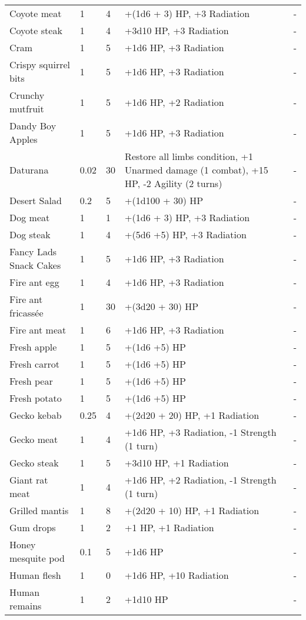 \documentclass{report}
\begin{document}
\begin{table}[H]
\begin{table}[H]
\begin{table}[H]
\begin{table}[H]
\begin{table}[H]
\begin{table}[H]
\begin{table}[H]
\begin{table}[H]
\begin{table}[H]
\begin{table}[H]
\begin{table}[H]
\begin{table}[H]
\begin{table}[H]
\begin{table}[H]
\begin{table}[H]
\begin{tabular}{p{30mm}p{30mm}p{30mm}p{30mm}p{30mm}}
Coyote meat  & 1 & 4 & +(1d6 + 3) HP, +3 Radiation & -  \\
Coyote steak  & 1 & 4 & +3d10 HP, +3 Radiation & -  \\
Cram  & 1 & 5 & +1d6 HP, +3 Radiation  & -  \\
Crispy squirrel bits  & 1 & 5 & +1d6 HP, +3 Radiation  & -  \\
Crunchy mutfruit  & 1 & 5 & +1d6 HP, +2 Radiation  & -  \\
Dandy Boy Apples  & 1 & 5 & +1d6 HP, +3 Radiation  & -  \\
Daturana  & 0.02  & 30 & Restore all limbs condition, +1 Unarmed damage (1 combat), +15 HP, -2 Agility (2 turns) & -  \\
Desert Salad  & 0.2  & 5 & +(1d100 + 30) HP  & -  \\
Dog meat  & 1 & 1 & +(1d6 + 3) HP, +3 Radiation  & -  \\
Dog steak  & 1 & 4 & +(5d6 +5) HP, +3 Radiation  & -  \\
Fancy Lads Snack Cakes  & 1 & 5 & +1d6 HP, +3 Radiation  & -  \\
Fire ant egg  & 1 & 4 & +1d6 HP, +3 Radiation  & -  \\
Fire ant fricassée  & 1 & 30 & +(3d20 + 30) HP & -  \\
Fire ant meat  & 1 & 6 & +1d6 HP, +3 Radiation  & -  \\
Fresh apple  & 1 & 5 & +(1d6 +5) HP  & -  \\
Fresh carrot  & 1 & 5 & +(1d6 +5) HP  & -  \\
Fresh pear  & 1 & 5 & +(1d6 +5) HP  & -  \\
Fresh potato  & 1 & 5 & +(1d6 +5) HP  & -  \\
Gecko kebab  & 0.25  & 4 & +(2d20 + 20) HP, +1 Radiation  & -  \\
Gecko meat  & 1 & 4 & +1d6 HP, +3 Radiation, -1 Strength (1 turn)  & -  \\
Gecko steak  & 1 & 5 & +3d10 HP, +1 Radiation  & -  \\
Giant rat meat  & 1 & 4 & +1d6 HP, +2 Radiation, -1 Strength (1 turn)  & -  \\
Grilled mantis  & 1 & 8 & +(2d20 + 10) HP, +1 Radiation  & -  \\
Gum drops  & 1 & 2 & +1 HP, +1 Radiation  & -  \\
Honey mesquite pod  & 0.1  & 5 & +1d6 HP  & -  \\
Human flesh  & 1 & 0 & +1d6 HP, +10 Radiation  & -  \\
Human remains  & 1 & 2 & +1d10 HP  & -  \\

\end{tabular}
\end{table}
\end{table}
\end{table}
\end{table}
\end{table}
\end{table}
\end{table}
\end{table}
\end{table}
\end{table}
\end{table}
\end{table}
\end{table}
\end{table}
\end{table}
\end{document}
